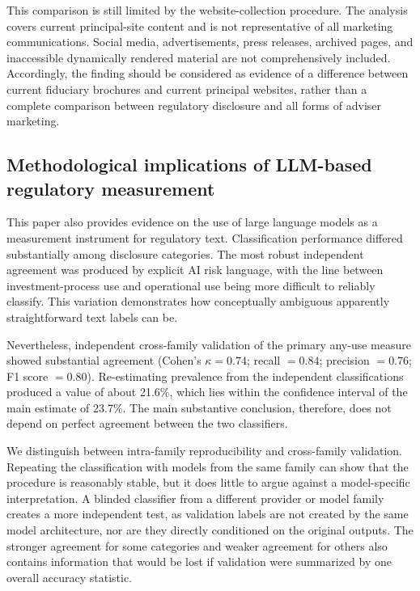 \documentclass[utf8]{FrontiersinHarvard}
\begin{document}
This comparison is still limited by the website-collection procedure. The analysis covers current principal-site content and is not representative of all marketing communications. Social media, advertisements, press releases, archived pages, and inaccessible dynamically rendered material are not comprehensively included. Accordingly, the finding should be considered as evidence of a difference between current fiduciary brochures and current principal websites, rather than a complete comparison between regulatory disclosure and all forms of adviser marketing.

\subsection{Methodological implications of LLM-based regulatory measurement}

This paper also provides evidence on the use of large language models as a measurement instrument for regulatory text. Classification performance differed substantially among disclosure categories. The most robust independent agreement was produced by explicit AI risk language, with the line between investment-process use and operational use being more difficult to reliably classify. This variation demonstrates how conceptually ambiguous apparently straightforward text labels can be.

Nevertheless, independent cross-family validation of the primary any-use measure showed substantial agreement (Cohen's $\kappa = 0.74$; recall $= 0.84$; precision $= 0.76$; F1 score $= 0.80$). Re-estimating prevalence from the independent classifications produced a value of about 21.6\%, which lies within the confidence interval of the main estimate of 23.7\%. The main substantive conclusion, therefore, does not depend on perfect agreement between the two classifiers.

We distinguish between intra-family reproducibility and cross-family validation. Repeating the classification with models from the same family can show that the procedure is reasonably stable, but it does little to argue against a model-specific interpretation. A blinded classifier from a different provider or model family creates a more independent test, as validation labels are not created by the same model architecture, nor are they directly conditioned on the original outputs. The stronger agreement for some categories and weaker agreement for others also contains information that would be lost if validation were summarized by one overall accuracy statistic.
\end{document}

